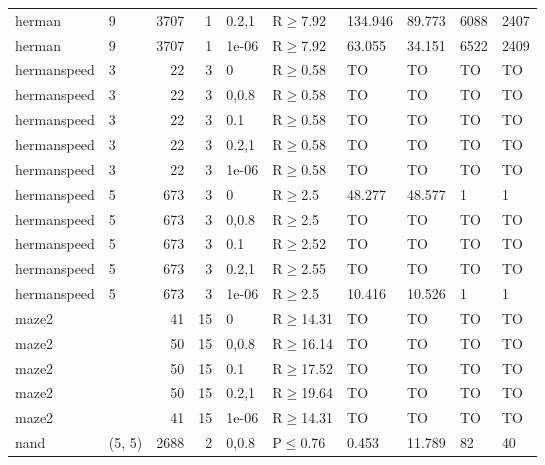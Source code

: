 \begin{longtable}{llrrllllll}
 herman        & 9         &   	3707 &   1 & 0.2,1 & R$\geq$7.92  & 134.946  & 89.773   & 6088    & 2407    \\
 herman        & 9         &   	3707 &   1 & 1e-06 & R$\geq$7.92  & 63.055   & 34.151   & 6522    & 2409    \\
 hermanspeed   & 3         &     	22 &   3 & 0     & R$\geq$0.58  & TO       & TO       & TO      & TO      \\
 hermanspeed   & 3         &     	22 &   3 & 0,0.8 & R$\geq$0.58  & TO       & TO       & TO      & TO      \\
 hermanspeed   & 3         &     	22 &   3 & 0.1   & R$\geq$0.58  & TO       & TO       & TO      & TO      \\
 hermanspeed   & 3         &     	22 &   3 & 0.2,1 & R$\geq$0.58  & TO       & TO       & TO      & TO      \\
 hermanspeed   & 3         &     	22 &   3 & 1e-06 & R$\geq$0.58  & TO       & TO       & TO      & TO      \\
 hermanspeed   & 5         &    	673 &   3 & 0     & R$\geq$2.5   & 48.277   & 48.577   & 1       & 1       \\
 hermanspeed   & 5         &    	673 &   3 & 0,0.8 & R$\geq$2.5   & TO       & TO       & TO      & TO      \\
 hermanspeed   & 5         &    	673 &   3 & 0.1   & R$\geq$2.52  & TO       & TO       & TO      & TO      \\
 hermanspeed   & 5         &    	673 &   3 & 0.2,1 & R$\geq$2.55  & TO       & TO       & TO      & TO      \\
 hermanspeed   & 5         &    	673 &   3 & 1e-06 & R$\geq$2.5   & 10.416   & 10.526   & 1       & 1       \\
 maze2         &           &     	41 &  15 & 0     & R$\geq$14.31 & TO       & TO       & TO      & TO      \\
 maze2         &           &     	50 &  15 & 0,0.8 & R$\geq$16.14 & TO       & TO       & TO      & TO      \\
 maze2         &           &     	50 &  15 & 0.1   & R$\geq$17.52 & TO       & TO       & TO      & TO      \\
 maze2         &           &     	50 &  15 & 0.2,1 & R$\geq$19.64 & TO       & TO       & TO      & TO      \\
 maze2         &           &     	41 &  15 & 1e-06 & R$\geq$14.31 & TO       & TO       & TO      & TO      \\
 nand          & (5, 5)    &   	2688 &   2 & 0,0.8 & P$\leq$0.76  & 0.453    & 11.789   & 82      & 40      \\

\end{longtable}
